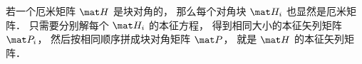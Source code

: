 

\begin{theorem}{}
若一个厄米矩阵 $\mat H$ 是块对角的， 那么每个对角块 $\mat H_i$ 也显然是厄米矩阵． 只需要分别解每个 $\mat H_i$ 的本征方程， 得到相同大小的本征矢列矩阵 $\mat P_i$， 然后按相同顺序拼成块对角矩阵 $\mat P$， 就是 $\mat H$ 的本征矢列矩阵．
\end{theorem}

